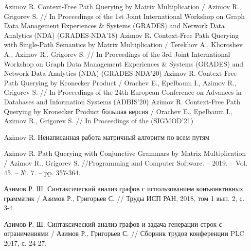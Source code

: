 
\begin{thebibliography}{99}
	 Azimov R. Context-Free Path Querying by
	Matrix Multiplication / Azimov R., Grigorev S. // In Proceedings of the
	1st Joint International Workshop on Graph Data Management Experiences \&
	Systems (GRADES) and Network Data Analytics (NDA) (GRADES-NDA’18)
	 Azimov R. Context-Free Path Querying with Single-Path Semantics by
	Matrix Multiplication / Terekhov A., Khoroshev A., Azimov R., Grigorev S. // In Proceedings of the
	3rd Joint International Workshop on Graph Data Management Experiences \&
	Systems (GRADES) and Network Data Analytics (NDA) (GRADES-NDA’20)
	 Azimov R. Context-Free Path Querying by Kronecker
	Product / Orachev E., Epelbaum I., Azimov R., Grigorev S. // In Proceedings of the
	24th European Conference on Advances in Databases and Information Systems (ADBIS’20)
	 Azimov R. Context-Free Path Querying by Kronecker
	Product большая версия / Orachev E., Epelbaum I., Azimov R., Grigorev S. // In Proceedings of the (SIGMOD’21)
	
	 Azimov R. Ненаписанная работа матричный алгоритм по всем путям
	
	 Azimov R. Path Querying with Conjunctive Grammars by Matrix Multiplication / Azimov R., Grigorev S. //Programming and Computer Software. – 2019. – Vol. 45. – №. 7. – pp. 357-364.
	\setcounter{firstbib}{\value{enumiv}}
	
	
	
	 Азимов Р. Ш. Синтаксический анализ графов с использованием конъюнктивных грамматик / Азимов Р., Григорьев С. // Труды ИСП РАН, 2018, том 1 вып. 2, с. 3-4.
	
	 Азимов Р. Ш. Синтаксический анализ графов и задача генерации строк с ограничениями / Азимов Р., Григорьев С. // Сборник трудов конференции PLC 2017, с. 24-27.
\end{thebibliography}